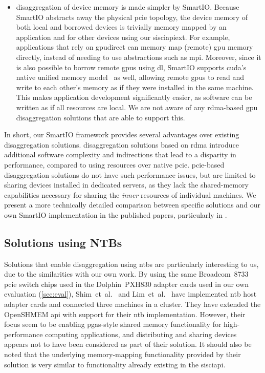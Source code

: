 \begin{itemize}
    \item \Gls{disaggregation} of device memory is made simpler by SmartIO.
        Because SmartIO abstracts away the physical \gls{pcie} topology, the device memory of both local and borrowed devices is trivially memory mapped by an application and for other devices using our \gls{sisciapiext}.
        For example, applications that rely on \gls{gpudirect} can memory map (remote) \gls{gpu} memory directly, instead of needing to use abstractions such as \gls{mpi}.
        Moreover, since it is also possible to borrow remote \glspl{gpu} using \gls{dl}, SmartIO supports \gls{cuda}'s native unified memory model~\cite{url:unified-memory} as well, allowing remote \glspl{gpu} to read and write to each other's memory as if they were installed in the same machine.
        This makes application development significantly easier, as software can be written as if all resources are local.
        We are not aware of any \gls{rdma}-based \gls{gpu} disaggregation solutions that are able to support this.

\end{itemize}



In short, our SmartIO framework provides several advantages over existing \gls{disaggregation} solutions.
\Gls{disaggregation} solutions based on \gls{rdma} introduce additional software complexity and indirections that lead to a disparity in performance, compared to using resources over native \gls{pcie}. 
%
\Gls{pcie}-based \gls{disaggregation} solutions do not have such performance issues, but are limited to sharing devices installed in dedicated servers, as they lack the shared-memory capabilities necessary for sharing the \emph{inner} resources of individual machines.
%
We present a more technically detailed comparison between specific solutions and our own SmartIO implementation in the published papers, particularly in .


\subsection{Solutions using NTBs}
Solutions that enable \gls{disaggregation} using \glspl{ntb} are particularly interesting to us, due to the similarities with our own work.
%
By using the same Broadcom~8733~\cite{pex8733} \gls{pcie} switch chips used in the Dolphin~PXH830 adapter cards used in our own evaluation (\cref{sec:eval}), Shim~et~al.~\cite{Shim2018} and Lim~et~al.~\cite{Lim2019} have implemented \gls{ntb} host adapter cards and connected three machines in a cluster.
%
They have extended the OpenSHMEM \gls{api} with support for their \gls{ntb} implementation.
%
However, their focus seem to be enabling \gls{pgas}-style shared memory functionality for high-performance computing applications, and distributing and sharing devices appears not to have been considered as part of their solution.
%
It should also be noted that the underlying memory-mapping functionality provided by their solution is very similar to functionality already existing in the \gls{sisciapi}.


